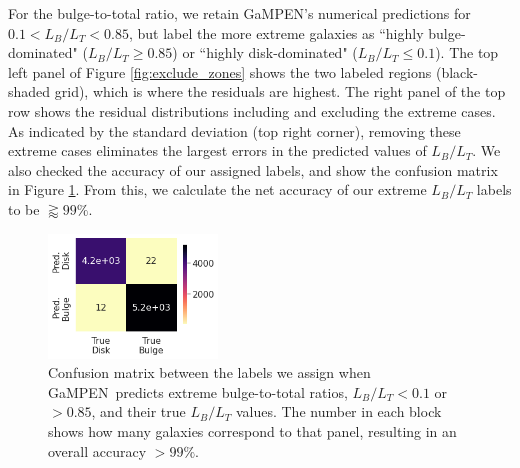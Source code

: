 \documentclass[twocolumn]{aastex63}
\newcommand\gampen{GaMPEN}
\begin{document}
\begin{CJK*}{UTF8}{gbsn}
For the bulge-to-total ratio, we retain \gampen's numerical predictions for $0.1 < L_B/L_T < 0.85$, but label the more extreme galaxies as ``highly bulge-dominated" ($L_B/L_T \geq 0.85$) or ``highly disk-dominated" ($L_B/L_T \leq 0.1$).
The top left panel of Figure \ref{fig:exclude_zones} shows the two labeled regions (black-shaded grid), which is where the residuals are highest. 
The right panel of the top row shows the residual distributions including and excluding the extreme cases. As indicated by the standard deviation (top right corner), removing these extreme cases eliminates the largest errors in the predicted values of $L_B/L_T$. We also checked the accuracy of our assigned labels, and show the confusion matrix in Figure \ref{fig:confusion_matrix}. From this, we calculate the net accuracy of our extreme $L_B/L_T$ labels to be $\gtrapprox99\%$. 

\begin{figure}[htb]
    \centering
    \includegraphics[width
    =0.4\textwidth]{confusion_matrix.png}
    \caption{Confusion matrix between the labels we assign when \gampen\ predicts extreme bulge-to-total ratios, $L_B/L_T <0.1$ or $>0.85$, and their true $L_B/L_T$ values. %
    The number in each block shows how many galaxies correspond to that panel, resulting in an overall accuracy $>99\%$.
    }
    \label{fig:confusion_matrix}
\end{figure}


\end{CJK*}
\end{document}
